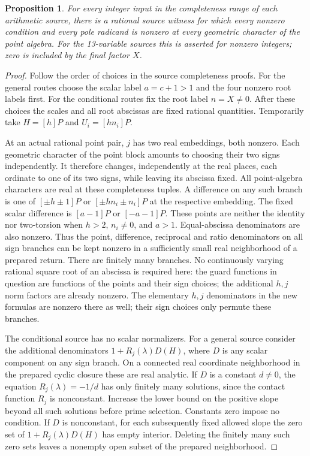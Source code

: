 \documentclass[11pt,a4paper]{article}
\newtheorem{proposition}[theorem]{Proposition}
\theoremstyle{remark}\newtheorem{remark}[theorem]{Remark}
\begin{document}
\begin{proposition}\label{prop:fullunits}
For every integer input in the completeness range of each arithmetic
source, there is a rational source witness for which every nonzero
condition and every pole radicand is nonzero at \emph{every} geometric
character of the point algebra. For the 13-variable sources this is
asserted for nonzero integers; zero is included by the final factor $X$.
\end{proposition}
\begin{proof}
Follow the order of choices in the source completeness proofs. For the
general routes choose the scalar label $a=c+1>1$ and the four nonzero
root labels first. For the conditional routes fix the root label $n=X\ne0$.
After these choices the scales and all root abscissas are fixed rational
quantities. Temporarily take $H=[h]P$ and $U_i=[hn_i]P$.

At an actual rational point pair, $j$ has two real embeddings, both
nonzero. Each geometric character of the point block amounts to choosing
their two signs independently. It therefore changes, independently at
the real places, each ordinate to one of its two signs, while leaving
its abscissa fixed. All point-algebra characters are real at these
completeness tuples. A difference on any such branch is one of
$[\pm h\pm1]P$ or $[\pm hn_i\pm n_i]P$ at the respective embedding.
The fixed scalar difference is $[a-1]P$ or $[-a-1]P$.
These points are neither the identity nor two-torsion when $h>2$,
$n_i\ne0$, and $a>1$. Equal-abscissa denominators are also nonzero.
Thus the point, difference, reciprocal and ratio denominators on all
sign branches can be kept nonzero in a sufficiently small real
neighborhood of a prepared return. There are finitely many branches. No continuously varying rational
square root of an abscissa is required here: the guard functions in
question are functions of the points and their sign choices; the
additional $h,j$ norm factors are already nonzero.
The elementary $h,j$ denominators in the new formulas are nonzero
there as well; their sign choices only permute these branches.

The conditional source has no scalar normalizers. For a general source
consider the additional denominators $1+R_j(\lambda)D(H)$, where $D$
is any scalar component on any sign branch. On a connected real
coordinate neighborhood in the prepared cyclic closure these are real
analytic. If $D$ is a constant $d\ne0$, the equation
$R_j(\lambda)=-1/d$ has only finitely many solutions, since the contact
function $R_j$ is nonconstant. Increase the lower bound on the positive
slope beyond all such solutions before prime selection. Constants zero
impose no condition. If $D$ is nonconstant, for each subsequently fixed
allowed slope the zero set of $1+R_j(\lambda)D(H)$ has empty interior.
Deleting the finitely many such zero sets leaves a nonempty open subset
of the prepared neighborhood.


\end{proof}
\end{document}

